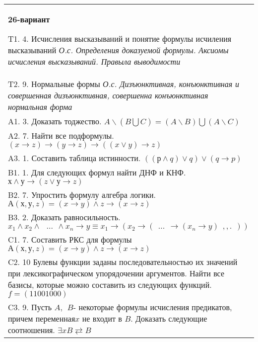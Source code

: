 \documentclass{article}
\begin{document}
\begin{tabular}{m{17cm}}
\textbf{26-вариант}
\newline

T1. 4. Исчисления высказываний и понятие формулы исчиления высказываний \emph{О.с. Определения доказуемой формулы. Аксиомы исчисления высказываний. Правыла выводимости} \\
T2. 9. Нормальные формы \emph{О.с. Дизъюнктивная, конъюнктивная и совершенная дизъюнктивная, совершенна конъюнктивная нормальная форма} \\
A1. 3. Доказать тоджество. \(A\backslash(B\bigcup C) = (A\backslash B)\bigcup(A\backslash C)\) \\
A2. 7. Найти все подформулы. \((x \rightarrow z) \rightarrow (y \rightarrow z) \rightarrow ((x \vee y) \rightarrow z)\) \\
A3. 1. Составить таблица истинности. \(\left( (р \land q) \vee q \right) \vee (q \rightarrow p)\) \\
B1. 1. Для следующих формул найти ДНФ и КНФ. \(х \land у \rightarrow (z \vee у \rightarrow z)\) \\
B2. 7. Упростить формулу алгебра логики. \(А(х,у,z) = (x \rightarrow y) \land z \rightarrow (x \rightarrow z)\) \\
B3. 2. Доказать равносильность.\(x_{1} \land x_{2} \land \ \ \ ...\ \  \land x_{n} \rightarrow y \equiv x_{1} \rightarrow (x_{2} \rightarrow (\ \ ...\ \  \rightarrow (x_{n} \rightarrow y)\ \ ,,.\ \ ))\) \\
C1. 7. Составить РКС для формулы \(А(х,у,z) = (x \rightarrow y) \land z \rightarrow (x \rightarrow z)\) \\
C2. 10 Булевы функции заданы последовательностью их значений при лексикографическом упорядочении аргументов. Найти все базисы, которые можно составить из следующих функций. \(f = (11001000)\) \\
C3. 9. Пусть \(A,\ \ B\)- некоторые формулы исчисления предикатов, причем переменная\(x\) не входит в \(B\). Доказать следующие соотношения. \(\exists xB \rightleftarrows B\)
 \\

\end{tabular}
\vspace{1cm}
\end{document}
